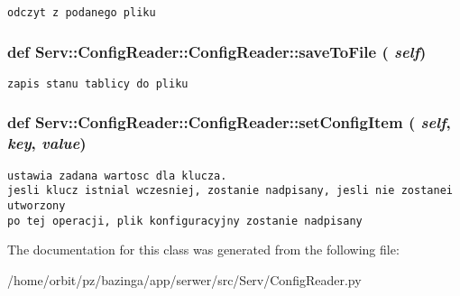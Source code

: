 \footnotesize\begin{verbatim}odczyt z podanego pliku

\end{verbatim}
\normalsize
 \hypertarget{class_serv_1_1_config_reader_1_1_config_reader_919cf4af7c9d0eb3a91ef578731edb0a}{
\subsubsection[{saveToFile}]{\setlength{\rightskip}{0pt plus 5cm}def Serv::ConfigReader::ConfigReader::saveToFile ( {\em self})}}
\label{class_serv_1_1_config_reader_1_1_config_reader_919cf4af7c9d0eb3a91ef578731edb0a}




\footnotesize\begin{verbatim}zapis stanu tablicy do pliku

\end{verbatim}
\normalsize
 \hypertarget{class_serv_1_1_config_reader_1_1_config_reader_44baeb28dc94ccbc797ab1164d98fa04}{
\subsubsection[{setConfigItem}]{\setlength{\rightskip}{0pt plus 5cm}def Serv::ConfigReader::ConfigReader::setConfigItem ( {\em self}, \/   {\em key}, \/   {\em value})}}
\label{class_serv_1_1_config_reader_1_1_config_reader_44baeb28dc94ccbc797ab1164d98fa04}




\footnotesize\begin{verbatim}ustawia zadana wartosc dla klucza.
jesli klucz istnial wczesniej, zostanie nadpisany, jesli nie zostanei utworzony
po tej operacji, plik konfiguracyjny zostanie nadpisany

\end{verbatim}
\normalsize
 

The documentation for this class was generated from the following file:\begin{CompactItemize}
\item 
/home/orbit/pz/bazinga/app/serwer/src/Serv/ConfigReader.py\end{CompactItemize}
